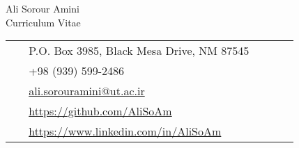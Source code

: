 \documentclass[10pt]{article} %
\begin{document}
\begin{paracol}{2} %


\parbox[top][0.12\textheight][c]{\linewidth}{ %
	\vspace{-0.04\textheight} %
	\centering %
	{\sffamily\Huge Ali Sorour Amini}\\\medskip %
	{\Huge\color{headings}\cvtextfont Curriculum Vitae}
}

\switchcolumn %

\parbox[top][0.12\textheight][c]{\linewidth}{ %
	\vspace{-0.04\textheight} %
	\colorbox{shade}{ %
		\begin{supertabular}{p{0.05\linewidth}|p{0.775\linewidth}} %
			\raisebox{-1pt}{\faHome} & P.O. Box 3985, Black Mesa Drive, NM 87545 \\ %
			\raisebox{-1pt}{\faPhone} & +98 (939) 599-2486 \\ %
      \raisebox{0pt}{\small\faEnvelope} & \href{mailto:ali.sorouramini@ut.ac.ir}{ali.sorouramini@ut.ac.ir} \\ %
			\raisebox{-1pt}{\faGithub} & \href{https://github.com/AliSoAm}{https://github.com/AliSoAm} \\ %
			\raisebox{-1pt}{\faLinkedinSquare} & \href{https://www.linkedin.com/in/AliSoAm}{https://www.linkedin.com/in/AliSoAm} \\ %
		\end{supertabular}
	}
}
\end{paracol}
\end{document}
